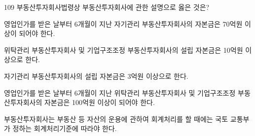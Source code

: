 \begin{question}{109}
부동산투자회사법령상 부동산투자회사에 관한 설명으로 옳은 것은?
\begin{choices}
  \item 영업인가를 받은 날부터 6개월이 지난 자기관리 부동산투자회사의 자본금은 70억원 이상이 되어야 한다.
  \item 위탁관리 부동산투자회사 및 기업구조조정 부동산투자회사의 설립 자본금은 10억원 이상으로 한다.
  \item 자기관리 부동산투자회사의 설립 자본금은 3억원 이상으로 한다.
  \item 영업인가를 받은 날부터 6개월이 지난 위탁관리 부동산투자회사 및 기업구조조정 부동산투자회사의 자본금은 100억원 이상이 되어야 한다.
  \item 부동산투자회사는 부동산 등 자산의 운용에 관하여 회계처리를 할 때에는 국토 교통부가 정하는 회계처리기준에 따라야 한다.
\end{choices}
\end{question}
